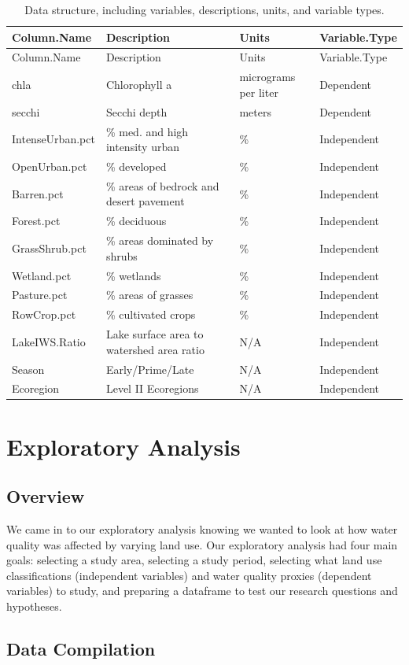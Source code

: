 \documentclass[12pt,]{article}
\begin{document}
\begin{longtable}[]{@{}llll@{}}
\caption{Data structure, including variables, descriptions, units, and
variable types.}\tabularnewline
\toprule
Column.Name & Description & Units & Variable.Type\tabularnewline
\midrule
\endfirsthead
\toprule
Column.Name & Description & Units & Variable.Type\tabularnewline
\midrule
\endhead
chla & Chlorophyll a & micrograms per liter & Dependent\tabularnewline
secchi & Secchi depth & meters & Dependent\tabularnewline
IntenseUrban.pct & \% med. and high intensity urban & \% &
Independent\tabularnewline
OpenUrban.pct & \% developed & \% & Independent\tabularnewline
Barren.pct & \% areas of bedrock and desert pavement & \% &
Independent\tabularnewline
Forest.pct & \% deciduous & \% & Independent\tabularnewline
GrassShrub.pct & \% areas dominated by shrubs & \% &
Independent\tabularnewline
Wetland.pct & \% wetlands & \% & Independent\tabularnewline
Pasture.pct & \% areas of grasses & \% & Independent\tabularnewline
RowCrop.pct & \% cultivated crops & \% & Independent\tabularnewline
LakeIWS.Ratio & Lake surface area to watershed area ratio & N/A &
Independent\tabularnewline
Season & Early/Prime/Late & N/A & Independent\tabularnewline
Ecoregion & Level II Ecoregions & N/A & Independent\tabularnewline
\bottomrule
\end{longtable}

\newpage

\hypertarget{exploratory-analysis}{%
\section{Exploratory Analysis}\label{exploratory-analysis}}

\hypertarget{overview}{%
\subsection{Overview}\label{overview}}

We came in to our exploratory analysis knowing we wanted to look at how
water quality was affected by varying land use. Our exploratory analysis
had four main goals: selecting a study area, selecting a study period,
selecting what land use classifications (independent variables) and
water quality proxies (dependent variables) to study, and preparing a
dataframe to test our research questions and hypotheses.

\hypertarget{data-compilation}{%
\subsection{Data Compilation}\label{data-compilation}}
\end{document}
